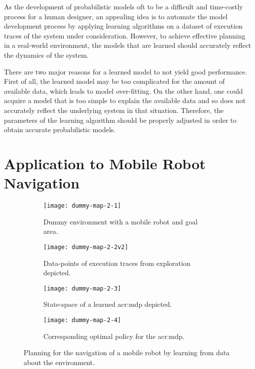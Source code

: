 As the development of probabilistic models oft to be a difficult and time-costly process for a human designer, an appealing idea is to automate the model development process by applying learning algorithms on a dataset of execution traces of the system under consideration.
However, to achieve effective planning in a real-world environment, the models that are learned should accurately reflect the dynamics of the system.

There are two major reasons for a learned model to not yield good performance.
First of all, the learned model may be too complicated for the amount of available data, which leads to model over-fitting.
On the other hand, one could acquire a model that is too simple to explain the available data and so does not accurately reflect the underlying system in that situation.
Therefore, the parameters of the learning algorithm should be properly adjusted in order to obtain accurate probabilistic models.

\newpage

\section{Application to Mobile Robot Navigation}
\label{sec:application-mobile-robot}

\begin{figure}[t]
	\centering
	
	\captionsetup{font=small}
	\captionsetup[subfigure]{font=footnotesize}
	\captionsetup[subfigure]{justification=centering}
	\begin{subfigure}{.5\textwidth}
		\centering
		\texttt{[image: dummy-map-2-1]}
		\caption{Dummy environment with a mobile robot and goal area.}
		\label{fig:dummy-map-1}
	\end{subfigure}\hfill
	\begin{subfigure}{.5\textwidth}
		\centering
		\texttt{[image: dummy-map-2-2v2]}
		\caption{Data-points of execution traces from exploration depicted.}
		\label{fig:dummy-map-2}
	\end{subfigure}
	
	\bigskip
	
	\begin{subfigure}{.5\textwidth}
		\centering
		\texttt{[image: dummy-map-2-3]}
		\caption{State-space of a learned \acrshort{acr:mdp} depicted.}
		\label{fig:dummy-map-3}
	\end{subfigure}\hfill
	\begin{subfigure}{.5\textwidth}
		\centering
		\texttt{[image: dummy-map-2-4]}
		\caption{Corresponding optimal policy for the \acrshort{acr:mdp}.}
		\label{fig:dummy-map-4}
	\end{subfigure}
	\caption{Planning for the navigation of a mobile robot by learning  from data about the environment.}
\end{figure}

